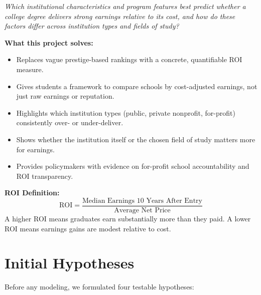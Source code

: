 \documentclass[12pt, letterpaper]{article}
\begin{document}
\begin{infobox}
\textit{Which institutional characteristics and program features best predict whether a college degree delivers strong earnings relative to its cost, and how do these factors differ across institution types and fields of study?}
\end{infobox}

\textbf{What this project solves:}
\begin{itemize}
  \item Replaces vague prestige-based rankings with a concrete, quantifiable ROI measure.
  \item Gives students a framework to compare schools by cost-adjusted earnings, not just raw earnings or reputation.
  \item Highlights which institution types (public, private nonprofit, for-profit) consistently over- or under-deliver.
  \item Shows whether the institution itself or the chosen field of study matters more for earnings.
  \item Provides policymakers with evidence on for-profit school accountability and ROI transparency.
\end{itemize}

\textbf{ROI Definition:}
\[
\text{ROI} = \frac{\text{Median Earnings 10 Years After Entry}}{\text{Average Net Price}}
\]
A higher ROI means graduates earn substantially more than they paid. A lower ROI means earnings gains are modest relative to cost.

\section{Initial Hypotheses}

Before any modeling, we formulated four testable hypotheses:
\end{document}
